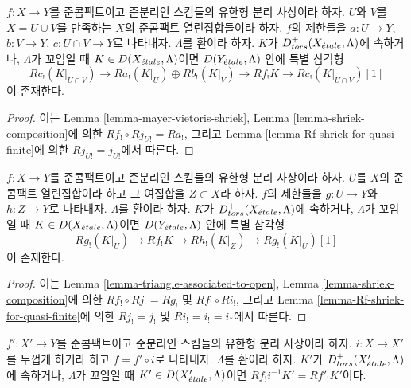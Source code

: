 \begin{lemma}
\label{lemma-relative-mayer-vietoris}
$f : X \to Y$를 준콤팩트이고 준분리인 스킴들의 유한형 분리 사상이라
하자. $U$와 $V$를 $X = U \cup V$를 만족하는 $X$의 준콤팩트 열린집합들이라
하자. $f$의 제한들을 $a : U \to Y$, $b : V \to Y$,
$c : U \cap V \to Y$로 나타내자. $\Lambda$를 환이라 하자.
$K$가 $D^+_{tors}(X_{\acute{e}tale}, \Lambda)$에 속하거나,
$\Lambda$가 꼬임일 때 $K \in D(X_{\acute{e}tale}, \Lambda)$이면
$D(Y_{\acute{e}tale}, \Lambda)$ 안에 특별 삼각형
$$
Rc_!(K|_{U \cap V}) \to
Ra_!(K|_U) \oplus Rb_!(K|_V) \to
Rf_!K \to 
Rc_!(K|_{U \cap V})[1]
$$
이 존재한다.
\end{lemma}

\begin{proof}
이는 Lemma \ref{lemma-mayer-vietoris-shriek},
Lemma \ref{lemma-shriek-composition}에 의한
$Rf_! \circ Rj_{U!} = Ra_!$, 그리고 Lemma
\ref{lemma-Rf-shriek-for-quasi-finite}에 의한
$Rj_{U!} = j_{U!}$에서 따른다.
\end{proof}

\begin{lemma}
\label{lemma-relative-triangle-associated-to-open}
$f : X \to Y$를 준콤팩트이고 준분리인 스킴들의 유한형 분리 사상이라
하자. $U$를 $X$의 준콤팩트 열린집합이라 하고 그 여집합을
$Z \subset X$라 하자. $f$의 제한들을 $g : U \to Y$와
$h : Z \to Y$로 나타내자. $\Lambda$를 환이라 하자.
$K$가 $D^+_{tors}(X_{\acute{e}tale}, \Lambda)$에 속하거나,
$\Lambda$가 꼬임일 때 $K \in D(X_{\acute{e}tale}, \Lambda)$이면
$D(Y_{\acute{e}tale}, \Lambda)$ 안에 특별 삼각형
$$
Rg_!(K|_U) \to
Rf_!K \to
Rh_!(K|_Z) \to
Rg_!(K|_U)[1]
$$
이 존재한다.
\end{lemma}

\begin{proof}
이는 Lemma \ref{lemma-triangle-associated-to-open},
Lemma \ref{lemma-shriek-composition}에 의한
$Rf_! \circ Rj_! = Rg_!$ 및 $Rf_! \circ Ri_!$,
그리고 Lemma \ref{lemma-Rf-shriek-for-quasi-finite}에 의한
$Rj_! = j_!$ 및 $Ri_! = i_! = i_*$에서 따른다.
\end{proof}


\begin{lemma}
\label{lemma-shriek-and-thickening}
$f' : X' \to Y$를 준콤팩트이고 준분리인 스킴들의 유한형 분리 사상이라
하자. $i : X \to X'$를 두껍게 하기라 하고
$f = f' \circ i$로 나타내자. $\Lambda$를 환이라 하자.
$K'$가 $D^+_{tors}(X'_{\acute{e}tale}, \Lambda)$에 속하거나,
$\Lambda$가 꼬임일 때 $K' \in D(X'_{\acute{e}tale}, \Lambda)$이면
$Rf_!i^{-1}K' = Rf'_!K'$이다.
\end{lemma}

